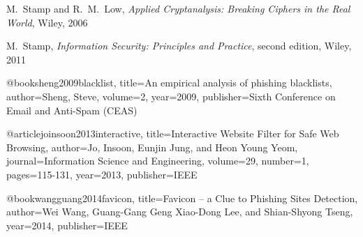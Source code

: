 \begin{thebibliography}{10}
 M.~Stamp and R.~M.~Low, {\it Applied Cryptanalysis: Breaking Ciphers 
in the Real World}, Wiley, 2006

 M.~Stamp, {\it Information Security: Principles and Practice}, second edition, 
Wiley, 2011

@book{sheng2009blacklist,
  title={An empirical analysis of phishing blacklists},
  author={Sheng, Steve},
  volume={2},
  year={2009},
  publisher={Sixth Conference on Email and Anti-Spam (CEAS)}
}

@article{joinsoon2013interactive,
  title={Interactive Website Filter for Safe Web Browsing},
  author={Jo, Insoon, Eunjin Jung, and Heon Young Yeom},
  journal={Information Science and Engineering},
  volume={29},
  number={1},
  pages={115-131},
  year={2013},
  publisher={IEEE}
}

@book{wangguang2014favicon,
  title={Favicon – a Clue to Phishing Sites Detection},
  author={Wei Wang, Guang-Gang Geng Xiao-Dong Lee, and Shian-Shyong Tseng},
  year={2014},
  publisher={IEEE}
}

\end{thebibliography}
